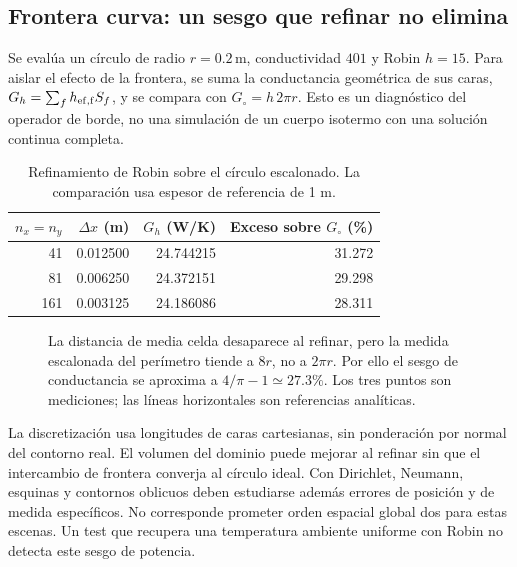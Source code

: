 \documentclass[11pt,a4paper]{article}
\begin{document}
\subsection{Frontera curva: un sesgo que refinar no elimina}
\label{sec:curve}
Se evalúa un círculo de radio $r=0.2\,\mathrm m$, conductividad $401$ y Robin
$h=15$. Para aislar el efecto de la frontera, se suma la conductancia
geométrica de sus caras, $G_h=\sum_f h_{\rm ef,f}S_f$, y se compara con
$G_\circ=h\,2\pi r$. Esto es un diagnóstico del operador de borde, no una
simulación de un cuerpo isotermo con una solución continua completa.

\begin{table}[htbp]\centering\small
\begin{tabular}{@{}rrrr@{}}\toprule
$n_x=n_y$ & $\Delta x$ (m) & $G_h$ (W/K) & Exceso sobre $G_\circ$ (\%)\\\midrule
41 & 0.012500 & 24.744215 & 31.272 \\
81 & 0.006250 & 24.372151 & 29.298 \\
161 & 0.003125 & 24.186086 & 28.311 \\
\bottomrule\end{tabular}
\caption{Refinamiento de Robin sobre el círculo escalonado. La comparación
usa espesor de referencia de 1 m.}
\end{table}

\begin{figure}[htbp]\centering
{}
\caption{La distancia de media celda desaparece al refinar, pero la medida
escalonada del perímetro tiende a $8r$, no a $2\pi r$. Por ello el sesgo de
conductancia se aproxima a $4/\pi-1\simeq27.3\%$. Los tres puntos son mediciones;
las líneas horizontales son referencias analíticas.}
\label{fig:robin}
\end{figure}

La discretización usa longitudes de caras cartesianas, sin ponderación por
normal del contorno real. El volumen del dominio puede mejorar al refinar sin
que el intercambio de frontera converja al círculo ideal. Con Dirichlet,
Neumann, esquinas y contornos oblicuos deben estudiarse además errores de
posición y de medida específicos. No corresponde prometer orden espacial
global dos para estas escenas. Un test que recupera una temperatura ambiente
uniforme con Robin no detecta este sesgo de potencia.
\end{document}
